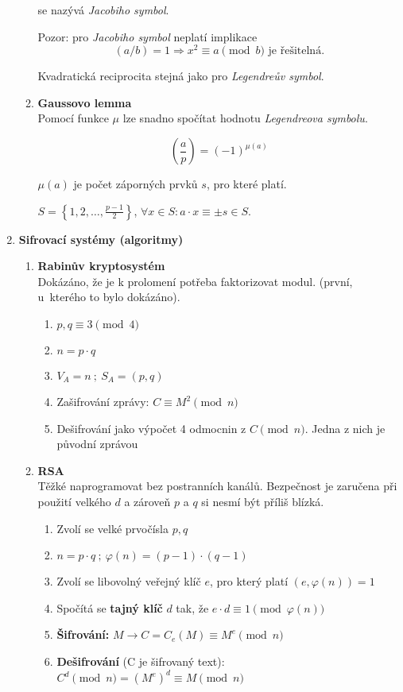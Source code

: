 \documentclass[12pt,a4paper]{article}
\begin{document}
\begin{enumerate}[leftmargin=*]
\begin{enumerate}
			se nazývá \textit{Jacobiho symbol}.
			
			Pozor: pro \textit{Jacobiho symbol} neplatí implikace
			\[ (a/b) = 1 \Rightarrow x^2 \equiv a \pmod{b} \text{ je řešitelná.} \]
			
			Kvadratická reciprocita stejná jako pro \textit{Legendreův symbol}.
			
			\item \textbf{Gaussovo lemma}\\
			Pomocí funkce $\mu$ lze snadno spočítat hodnotu \textit{Legendreova
				symbolu}.
			
			\[ \genfrac(){}{0}{a}{p} = (-1)^{\mu(a)} \]
			
			$\mu(a)$ je počet záporných prvků $s$, pro které platí.
			
			\centering 
			$S = \left\{1, 2, \dots, \frac{p-1}{2}\right\}$,
			$\forall x \in S : a \cdot x \equiv \pm s \in S$. 
			
		\end{enumerate}
		
		
		
		\pagebreak	
		\item \textbf{Sifrovací systémy (algoritmy)}
		\begin{enumerate}
			\item \textbf{Rabinův kryptosystém}\\
			Dokázáno, že je k prolomení potřeba faktorizovat modul. (první, u~kterého to bylo dokázáno).
			
			\begin{enumerate}
				\item $p,q \equiv 3 \pmod{4}$
				\item $n = p \cdot q$
				\item $V_A = n~;~S_A = (p,q)$
				\item Zašifrování zprávy: $C \equiv M^2 \pmod{n}$
				\item Dešifrování jako výpočet 4 odmocnin z $C \pmod{n}$. Jedna z nich je původní zprávou
			\end{enumerate}
			
			\item \textbf{RSA}\\
			Těžké naprogramovat bez postranních kanálů. Bezpečnost je zaručena při použití velkého $d$ a zároveň $ p$ a $q$ si nesmí být příliš blízká.
			\begin{enumerate}
				\item Zvolí se velké prvočísla $p,q$
				\item $n = p \cdot q~;~ \varphi(n) = (p-1)\cdot(q-1)$
				\item Zvolí se libovolný veřejný klíč $e$, pro který platí $(e,\varphi(n)) = 1$
				\item Spočítá se \textbf {tajný klíč}  $d$ tak, že $e\cdot d \equiv 1 \pmod{\varphi(n)}$
				\item \textbf{Šifrování:} $M \rightarrow C=C_e(M) \equiv M^e \pmod{n}$
				\item \textbf{Dešifrování}  (C je šifrovaný text): $C^d \pmod{n} = (M^e)^d \equiv M \pmod{n}$
			\end{enumerate}
			

\end{enumerate}
\end{enumerate}
\end{document}

